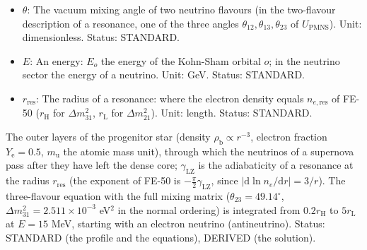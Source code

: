 \documentclass[
  10pt,
]{article}
\begin{document}
\begin{itemize}
  \(\Delta m_{ij}^2 = m_i^2 - m_j^2\) the squared-mass difference of the
  states \(i\) and \(j\) (\(\Delta m_{21}^2\), \(\Delta m_{31}^2\),
  \(\Delta m_{32}^2\)); \(\Delta m^2\) without labels the difference of
  the two states of a resonance, \(m_2^2 - m_1^2\), multiplied by
  \(v_{\mathrm{loc}}^2/v^2\) where this differs from 1. Unit: GeV.
  Status: STANDARD.
\item
  \(\theta\): The vacuum mixing angle of two neutrino flavours (in the
  two-flavour description of a resonance, one of the three angles
  \(\theta_{12}, \theta_{13}, \theta_{23}\) of \(U_{\mathrm{PMNS}}\)).
  Unit: dimensionless. Status: STANDARD.
\item
  \(E\): An energy: \(E_o\) the energy of the Kohn-Sham orbital \(o\);
  in the neutrino sector the energy of a neutrino. Unit: GeV. Status:
  STANDARD.
\item
  \(r_{\mathrm{res}}\): The radius of a resonance: where the electron
  density equals \(n_{e,\mathrm{res}}\) of FE-50 (\(r_{\mathrm{H}}\) for
  \(\Delta m^2_{31}\), \(r_{\mathrm{L}}\) for \(\Delta m^2_{21}\)).
  Unit: length. Status: STANDARD.
\end{itemize}

The outer layers of the progenitor star (density
\(\rho_{\mathrm{b}} \propto r^{-3}\), electron fraction
\(Y_{\mathrm{e}} = 0.5\), \(m_{\mathrm{u}}\) the atomic mass unit),
through which the neutrinos of a supernova pass after they have left the
dense core; \(\gamma_{\mathrm{LZ}}\) is the adiabaticity of a resonance
at the radius \(r_{\mathrm{res}}\) (the exponent of FE-50 is
\(-\frac{\pi}{2}\gamma_{\mathrm{LZ}}\), since
\(\lvert\mathrm{d}\ln n_e/\mathrm{d}r\rvert = 3/r\)). The three-flavour
equation with the full mixing matrix (\(\theta_{23} = 49.14^\circ\),
\(\Delta m^2_{31} = 2.511\times10^{-3}\) eV\(^2\) in the normal
ordering) is integrated from \(0.2r_{\mathrm{H}}\) to
\(5r_{\mathrm{L}}\) at \(E = 15\) MeV, starting with an electron
neutrino (antineutrino). Status: STANDARD (the profile and the
equations), DERIVED (the solution).
\end{document}
